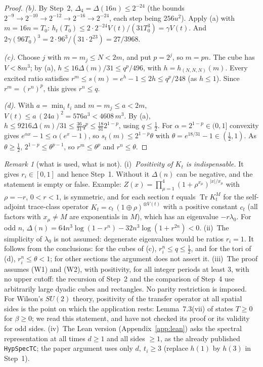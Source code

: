 \documentclass[11pt,a4paper]{article}
\theoremstyle{plain}
\theoremstyle{definition}
\theoremstyle{remark}
\newtheorem{remark}[theorem]{Remark}
\numberwithin{equation}{section}
\begin{document}
\begin{proof}
\emph{(b).} By Step~2, $\Delta_4=\Delta(16n)\le2^{-24}$ (the bounds $2^{-9}\to2^{-10}\to2^{-12}\to2^{-16}\to2^{-24}$, each step being $256u^2$). Apply (a) with $m=16n=T_0$: $h_t(T_0)\le2\cdot2^{-24}V(t)/(31T_0^3)=\gamma V(t)$. And $2\gamma(96T_0)^3=2\cdot96^3/(31\cdot2^{23})=27/3968$.

\emph{(c).} Choose $j$ with $m=m_j\le N<2m$, and put $p=2^j$, so $m=pn$. The cube has $V<8m^3$; by (a), $h\le16\Delta(m)/31\le q^p/496$, with $h=h_{(N,N,N)}(m)$. Every excited ratio satisfies $r^m\le s(m)=e^h-1\le2h\le q^p/248$ (as $h\le1$). Since $r^m=(r^n)^p$, this gives $r^n\le q$.

\emph{(d).} With $a=\min_it_i$ and $m=m_j\le a<2m$, $V(t)\le a\,(24a)^2=576a^3<4608\,m^3$. By (a), $h\le9216\Delta(m)/31\le\frac{36}{31}q^p\le\frac{18}{31}2^{1-p}$, using $q\le\frac12$. For $\alpha=2^{1-p}\in(0,1]$ convexity gives $e^{\alpha x}-1\le\alpha(e^x-1)$, so $s_t(m)\le2^{1-p}\theta$ with $\theta=e^{18/31}-1\in(\frac12,1)$. As $\theta\ge\frac12$, $2^{1-p}\le\theta^{p-1}$, so $r^m\le\theta^p$ and $r^n\le\theta$.
\end{proof}

\begin{remark}[what is used, what is not]\label{rem:Rused}
(i)~\emph{Positivity of $K_t$ is indispensable.} It gives $r_i\in[0,1]$ and hence Step~1. Without it $\Delta(n)$ can be negative, and the statement is empty or false. Example: $Z(x)=\prod_{\mu=1}^4(1+\rho^{x_\mu})^{|x|/x_\mu}$ with $\rho=-r$, $0<r<1$, is symmetric, and for each section $t$ equals $\operatorname{Tr}K_t^M$ for the self-adjoint trace-class operator $K_t=c_t\,(1\oplus\rho)^{\otimes V(t)}$ with a positive constant $c_t$ (all factors with $x_\mu\neq M$ are exponentials in $M$), which has an eigenvalue $-r\lambda_0$. For odd $n$, $\Delta(n)=64n^3\log(1-r^n)-32n^3\log(1+r^{2n})<0$. (ii)~The simplicity of $\lambda_0$ is not assumed: degenerate eigenvalues would be ratios $r_i=1$. It follows from the conclusions: for the cubes of (c), $r_i^n\le q\le\frac12$, and for the tori of (d), $r_i^n\le\theta<1$; for other sections the argument does not assert it. (iii)~The proof assumes (W1) and (W2), with positivity, for all integer periods at least $3$, with no upper cutoff: the recursion of Step~2 and the comparison of Step~4 use arbitrarily large dyadic cubes and rectangles. No parity restriction is imposed. For Wilson's $SU(2)$ theory, positivity of the transfer operator at all spatial sides is the point on which the application rests: Lemma~7.3(vii) of \cite{BB26v5} states $T\ge0$ for $\beta\ge0$; we read this statement, and have not checked its proof or its validity for odd sides. (iv)~The Lean version (Appendix~\ref{app:lean}) asks the spectral representation at all times $d\ge1$ and all sides $\ge1$, as the already published \texttt{HypSpecTC}; the paper argument uses only $d,\ t_i\ge3$ (replace $h(1)$ by $h(3)$ in Step~1).
\end{remark}
\end{document}
